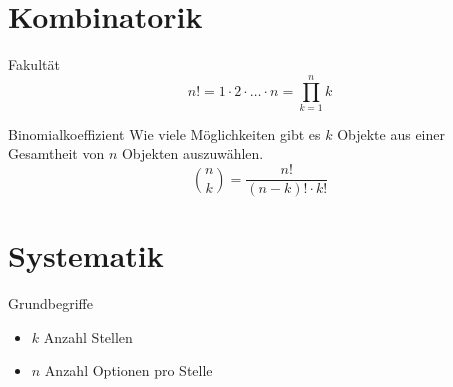 \section{Kombinatorik}
\begin{definition}{Fakultät}
$$
n!=1 \cdot 2 \cdot \ldots \cdot n=\prod_{k=1}^{n} k
$$
\end{definition}

\begin{definition}{Binomialkoeffizient}
Wie viele Möglichkeiten gibt es $k$ Objekte aus einer Gesamtheit von $n$ Objekten auszuwählen.
$$
\binom{n}{k}=\frac{n!}{(n-k)!\cdot k!}
$$
\end{definition}

\section{Systematik}
\begin{concept}{Grundbegriffe}
\begin{itemize}
  \item $k$ Anzahl Stellen
  \item $n$ Anzahl Optionen pro Stelle
\end{itemize}

\begin{center}
\end{center}
\end{concept}
